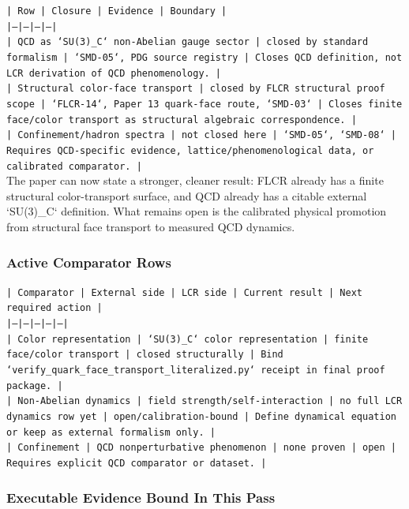 \documentclass[11pt]{article}
\begin{document}
\noindent\texttt{| Row | Closure | Evidence | Boundary |}\\
\noindent\texttt{|---|---|---|---|}\\
\noindent\texttt{| QCD as `SU(3)\_C` non-Abelian gauge sector | closed by standard formalism | `SMD-05`, PDG source registry | Closes QCD definition, not LCR derivation of QCD phenomenology. |}\\
\noindent\texttt{| Structural color-face transport | closed by FLCR structural proof scope | `FLCR-14`, Paper 13 quark-face route, `SMD-03` | Closes finite face/color transport as structural algebraic correspondence. |}\\
\noindent\texttt{| Confinement/hadron spectra | not closed here | `SMD-05`, `SMD-08` | Requires QCD-specific evidence, lattice/phenomenological data, or calibrated comparator. |}\\

The paper can now state a stronger, cleaner result: FLCR already has a finite structural color-transport surface, and QCD already has a citable external `SU(3)\_C` definition. What remains open is the calibrated physical promotion from structural face transport to measured QCD dynamics.

\subsubsection*{Active Comparator Rows}

\noindent\texttt{| Comparator | External side | LCR side | Current result | Next required action |}\\
\noindent\texttt{|---|---|---|---|---|}\\
\noindent\texttt{| Color representation | `SU(3)\_C` color representation | finite face/color transport | closed structurally | Bind `verify\_quark\_face\_transport\_literalized.py` receipt in final proof package. |}\\
\noindent\texttt{| Non-Abelian dynamics | field strength/self-interaction | no full LCR dynamics row yet | open/calibration-bound | Define dynamical equation or keep as external formalism only. |}\\
\noindent\texttt{| Confinement | QCD nonperturbative phenomenon | none proven | open | Requires explicit QCD comparator or dataset. |}\\

\subsubsection*{Executable Evidence Bound In This Pass}
\end{document}
